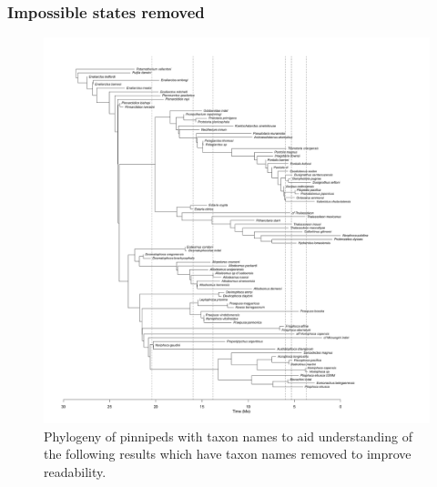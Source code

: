 \documentclass[a4paper, 12pt]{article}
\begin{document}
\subsubsection{Impossible states removed}

\begin{figure}[H]
 \centering
  \includegraphics[width = \linewidth]{figures/all-pinnipeds-tree.png}
  \caption{Phylogeny of pinnipeds with taxon names to aid understanding of the following results which have taxon names removed to improve readability.}
  \label{fig-all-tree}
\end{figure} 
\end{document}
